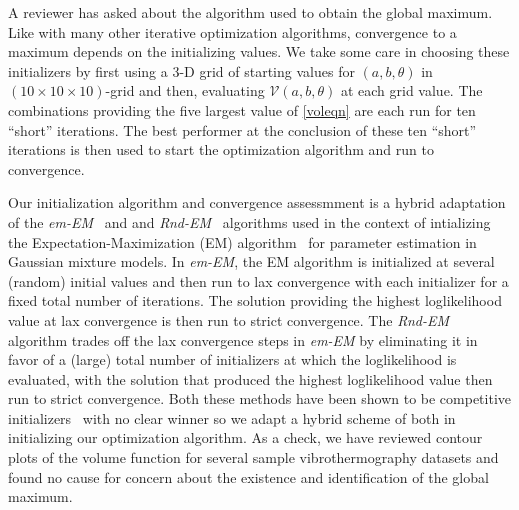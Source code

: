 \documentclass[12pt]{article}
\newcommand{\mV}{\mathcal V}
\begin{document}
A reviewer has asked about the algorithm used to obtain the
global maximum. Like with many other iterative optimization algorithms,
convergence to a maximum depends on the initializing values. We take
some care in choosing these initializers by first using a
3-D grid of starting  values for $(a, b, \theta)$ in
$(10\!\times\!10\!\times\!10)$-grid and then, evaluating $\mV(a,b,\theta)$
at each grid value. The combinations 
providing the five largest value of \eqref{voleqn} are each run for
ten ``short'' iterations. The best performer at the conclusion of
these ten ``short'' iterations is then used to start the optimization
algorithm and run to convergence. 

Our initialization algorithm and convergence assessmment is a hybrid
adaptation of the {\em em-EM}~\citep{biernackietal03} and  and {\em
  Rnd-EM}~\citep{maitra09} algorithms used in the context of
intializing the Expectation-Maximization (EM)
algorithm~\citep{dempsteretal77,mclachlanandkrishnan08} for parameter
estimation in Gaussian mixture models. In {\em em-EM}, the EM
algorithm  is initialized at several (random) initial values and then
run to lax convergence with each initializer for a fixed total number
of iterations. The solution providing the highest loglikelihood value
at lax convergence is then run to strict convergence. The {\em Rnd-EM}
algorithm trades off the lax convergence steps in {\em em-EM} by
eliminating it in favor of a (large) total number of initializers at
which the loglikelihood is evaluated, with the solution that produced
the highest loglikelihood value then run to strict convergence. Both
these methods have been shown to be competitive
initializers~\citep{maitraandmelnykov10} with no clear winner so we 
adapt a hybrid scheme of both in initializing our optimization
algorithm. As a check, we have reviewed contour plots of the volume
function for several sample vibrothermography datasets and found no cause for
concern about the existence and identification of the global maximum.

\end{document}
